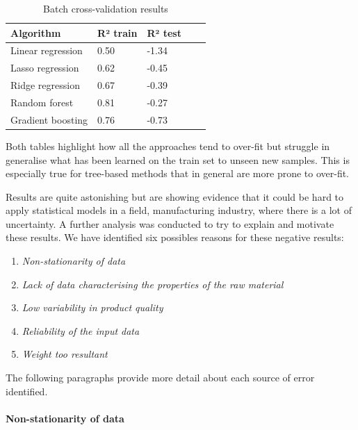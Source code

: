 \begin{table}[]
\centering
\caption{Batch cross-validation results}
\label{tab:batch_cross_validation_results}
\begin{tabular}{lllll}
\toprule
\textbf{Algorithm} & \textbf{R² train} & \textbf{R² test} \\
\midrule
Linear regression    & 0.50   & -1.34  \\ 
Lasso regression     & 0.62   & -0.45  \\ 
Ridge regression     & 0.67   & -0.39  \\ 
Random forest        & 0.81   & -0.27  \\ 
Gradient boosting    & 0.76   & -0.73  \\ 
\bottomrule
\end{tabular}
\end{table}

Both tables highlight how all the approaches tend to over-fit but struggle in generalise what has been learned on the train set to unseen new samples. This is especially true for tree-based methods that in general are more prone to over-fit. 

Results are quite astonishing but are showing evidence that it could be hard to apply statistical models in a field, manufacturing industry, where there is a lot of uncertainty. A further analysis was conducted to try to explain and motivate these results. We have identified six possibles reasons for these negative results:
%
\begin{enumerate}
    \item \textit{Non-stationarity of data}
    \item \textit{Lack of data characterising the properties of the raw material}
    \item \textit{Low variability in product quality}
    \item \textit{Reliability of the input data}
    \item \textit{Weight too resultant}
\end{enumerate}
%
The following paragraphs provide more detail about each  source of error identified. 

\paragraph{Non-stationarity of data}

